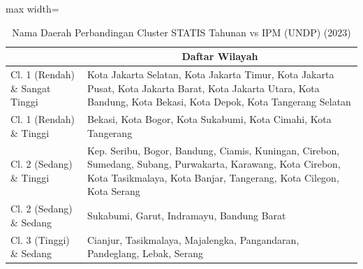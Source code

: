 \begin{table}[H]
\centering
\caption{Nama Daerah Perbandingan Cluster STATIS Tahunan vs IPM (UNDP) (2023)} \label{tab:app2statis_ipm_name_2023}
\begin{adjustbox}{max width=\textwidth}
\begin{tabular}{|>{\centering\arraybackslash}p{4cm}|p{10cm}|}
\hline
\multicolumn{1}{|c|}{\textbf{Kategori}} & \multicolumn{1}{c|}{\textbf{Daftar Wilayah}} \\
\hline
Cl. 1 (Rendah) \& Sangat Tinggi & Kota Jakarta Selatan, Kota Jakarta Timur, Kota Jakarta Pusat, Kota Jakarta Barat, Kota Jakarta Utara, Kota Bandung, Kota Bekasi, Kota Depok, Kota Tangerang Selatan \\
\hline
Cl. 1 (Rendah) \& Tinggi & Bekasi, Kota Bogor, Kota Sukabumi, Kota Cimahi, Kota Tangerang \\
\hline
Cl. 2 (Sedang) \& Tinggi & Kep. Seribu, Bogor, Bandung, Ciamis, Kuningan, Cirebon, Sumedang, Subang, Purwakarta, Karawang, Kota Cirebon, Kota Tasikmalaya, Kota Banjar, Tangerang, Kota Cilegon, Kota Serang \\
\hline
Cl. 2 (Sedang) \& Sedang & Sukabumi, Garut, Indramayu, Bandung Barat \\
\hline
Cl. 3 (Tinggi) \& Sedang & Cianjur, Tasikmalaya, Majalengka, Pangandaran, Pandeglang, Lebak, Serang \\
\hline
\end{tabular}
\end{adjustbox}
\end{table}